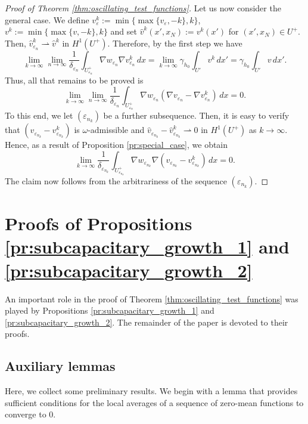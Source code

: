 \documentclass{article}
\numberwithin{equation}{section}
\theoremstyle{definition}
\theoremstyle{remark}
\begin{document}
\begin{proof}[Proof of Theorem \ref{thm:oscillating_test_functions}]
    Let us now consider the general case. We define $v_\varepsilon^k := \min \{\max \{v_\varepsilon, -k\}, k\}$, $v^k := \min \{\max \{v, -k\}, k\}$ and set $\hat{v}^k(x', x_N) := v^k(x')$ for $(x', x_N) \in U^+$. Then, $\hat{v}_{\varepsilon_n}^k \rightharpoonup \hat{v}^k$ in $H^1(U^+)$. Therefore, by the first step we have
    \begin{equation*}
        \lim_{k \to \infty} \lim_{n \to \infty} \frac{1}{\delta_{\varepsilon_n}} \int_{U_{\varepsilon_n}^+} \nabla w_{\varepsilon_n} \nabla v_{\varepsilon_n}^k \, dx = \lim_{k \to \infty} \gamma_{h_0} \int_{U'} v^k \, dx' = \gamma_{h_0} \int_{U'} v \, dx'.
    \end{equation*}
    Thus, all that remains to be proved is
    \[
    \lim_{k \to \infty} \lim_{n \to \infty} \frac{1}{\delta_{\varepsilon_n}} \int_{U_{\varepsilon_n}^+} \nabla w_{\varepsilon_n} (\nabla v_{\varepsilon_n} - \nabla v_{\varepsilon_n}^k) \, dx = 0.
    \]
    To this end, we let $(\varepsilon_{n_k})$ be a further subsequence. Then, it is easy to verify that $(v_{\varepsilon_{n_k}} - v_{\varepsilon_{n_k}}^k)$ is $\omega$-admissible and $\hat{v}_{\varepsilon_{n_k}} - \hat{v}_{\varepsilon_{n_k}}^k \rightharpoonup 0$ in $H^1(U^+)$ as $k \to \infty$. Hence, as a result of Proposition \ref{pr:special_case}, we obtain
    \[
    \lim_{k \to \infty} \frac{1}{\delta_{\varepsilon_{n_k}}} \int_{U_{\varepsilon_{n_k}}^+} \nabla w_{\varepsilon_{n_k}} \nabla (v_{\varepsilon_{n_k}} - v_{\varepsilon_{n_k}}^k) \, dx = 0.
    \]
    The claim now follows from the arbitrariness of the sequence $(\varepsilon_{n_k})$.
\end{proof}

\section{Proofs of Propositions \ref{pr:subcapacitary_growth_1} and \ref{pr:subcapacitary_growth_2}} \label{sec:not_appendix}

An important role in the proof of Theorem \ref{thm:oscillating_test_functions} was played by Propositions \ref{pr:subcapacitary_growth_1} and \ref{pr:subcapacitary_growth_2}. The remainder of the paper is devoted to their proofs.

\subsection{Auxiliary lemmas}

Here, we collect some preliminary results. We begin with a lemma that provides sufficient conditions for the local averages of a sequence of zero-mean functions to converge to $0$.
\end{document}
